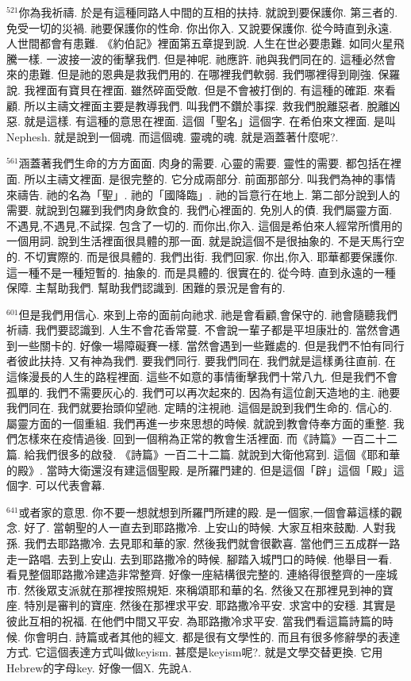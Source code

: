 \documentclass{book}
\begin{document}
$^{521}$你為我祈禱.
於是有這種同路人中間的互相的扶持.
就說到要保護你.
第三者的.
免受一切的災禍.
祂要保護你的性命.
你出你入.
又說要保護你.
從今時直到永遠.
人世間都會有患難.
《約伯記》裡面第五章提到說.
人生在世必要患難.
如同火星飛騰一樣.
一波接一波的衝擊我們.
但是神呢.
祂應許.
祂與我們同在的.
這種必然會來的患難.
但是祂的恩典是救我們用的.
在哪裡我們軟弱.
我們哪裡得到剛強.
保羅說.
我裡面有寶貝在裡面.
雖然碎面受敵.
但是不會被打倒的.
有這種的確距.
來看顧.
所以主禱文裡面主要是教導我們.
叫我們不鑽於事探.
救我們脫離惡者.
脫離凶惡.
就是這樣.
有這種的意思在裡面.
這個「聖名」這個字.
在希伯來文裡面.
是叫Nephesh.
就是說到一個魂.
而這個魂.
靈魂的魂.
就是涵蓋著什麼呢?.

$^{561}$涵蓋著我們生命的方方面面.
肉身的需要.
心靈的需要.
靈性的需要.
都包括在裡面.
所以主禱文裡面.
是很完整的.
它分成兩部分.
前面那部分.
叫我們為神的事情來禱告.
祂的名為「聖」.
祂的「國降臨」.
祂的旨意行在地上.
第二部分說到人的需要.
就說到包羅到我們肉身飲食的.
我們心裡面的.
免別人的債.
我們屬靈方面.
不遇見,不遇見,不試探.
包含了一切的.
而你出,你入.
這個是希伯來人經常所慣用的一個用詞.
說到生活裡面很具體的那一面.
就是說這個不是很抽象的.
不是天馬行空的.
不切實際的.
而是很具體的.
我們出街.
我們回家.
你出,你入.
耶華都要保護你.
這一種不是一種短暫的.
抽象的.
而是具體的.
很實在的.
從今時.
直到永遠的一種保障.
主幫助我們.
幫助我們認識到.
困難的景況是會有的.

$^{601}$但是我們用信心.
來到上帝的面前向祂求.
祂是會看顧,會保守的.
祂會隨聽我們祈禱.
我們要認識到.
人生不會花香常蔓.
不會說一輩子都是平坦康壯的.
當然會遇到一些關卡的.
好像一場障礙賽一樣.
當然會遇到一些難處的.
但是我們不怕有同行者彼此扶持.
又有神為我們.
要我們同行.
要我們同在.
我們就是這樣勇往直前.
在這條漫長的人生的路程裡面.
這些不如意的事情衝擊我們十常八九.
但是我們不會孤單的.
我們不需要灰心的.
我們可以再次起來的.
因為有這位創天造地的主.
祂要我們同在.
我們就要抬頭仰望祂.
定睛的注視祂.
這個是說到我們生命的.
信心的.
屬靈方面的一個重組.
我們再進一步來思想的時候.
就說到教會侍奉方面的重整.
我們怎樣來在疫情過後.
回到一個稍為正常的教會生活裡面.
而《詩篇》一百二十二篇.
給我們很多的啟發.
《詩篇》一百二十二篇.
就說到大衛他寫到.
這個《耶和華的殿》.
當時大衛還沒有建這個聖殿.
是所羅門建的.
但是這個「辟」這個「殿」這個字.
可以代表會幕.

$^{641}$或者家的意思.
你不要一想就想到所羅門所建的殿.
是一個家,一個會幕這樣的觀念.
好了.
當朝聖的人一直去到耶路撒冷.
上安山的時候.
大家互相來鼓勵.
人對我孫.
我們去耶路撒冷.
去見耶和華的家.
然後我們就會很歡喜.
當他們三五成群一路走一路唱.
去到上安山.
去到耶路撒冷的時候.
腳踏入城門口的時候.
他舉目一看.
看見整個耶路撒冷建造非常整齊.
好像一座結構很完整的.
連絡得很整齊的一座城市.
然後眾支派就在那裡按照規矩.
來稱頌耶和華的名.
然後又在那裡見到神的寶座.
特別是審判的寶座.
然後在那裡求平安.
耶路撒冷平安.
求宮中的安穩.
其實是彼此互相的祝福.
在他們中間又平安.
為耶路撒冷求平安.
當我們看這篇詩篇的時候.
你會明白.
詩篇或者其他的經文.
都是很有文學性的.
而且有很多修辭學的表達方式.
它這個表達方式叫做keyism.
甚麼是keyism呢?.
就是文學交替更換.
它用Hebrew的字母key.
好像一個X.
先說A.
\end{document}
